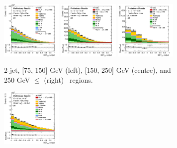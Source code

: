 \begin{figure}[h!]
    \centering
    \begin{subfigure}[b]{\textwidth}
        \centering
        \includegraphics[width=0.32\textwidth]{Images/VH/Own_fit/prefit_VHcc/Region_distmva_BMax150_BMin75_DSR_J2_TTypext_T2_L1_Y6051_Prefit.png}
        \includegraphics[width=0.32\textwidth]{Images/VH/Own_fit/prefit_VHcc/Region_distmva_BMax250_BMin150_DSR_J2_TTypext_T2_L1_Y6051_Prefit.png}
        \includegraphics[width=0.32\textwidth]{Images/VH/Own_fit/prefit_VHcc/Region_distmva_BMin250_DSR_J2_TTypext_T2_L1_Y6051_Prefit.png}
        \caption{2-jet, [75, 150] GeV (left), [150, 250] GeV (centre), and 250  GeV $\leq$ (right) \ptv\ regions.}
        \label{fig:plots_VHcc_1L_SR_2J_2c}
    \end{subfigure}
    \begin{subfigure}[b]{\textwidth}
        \centering
        \includegraphics[width=0.32\textwidth]{Images/VH/Own_fit/prefit_VHcc/Region_distmva_BMax150_BMin75_DSR_J3_TTypext_T2_L1_Y6051_Prefit.png}

\end{subfigure}
\end{figure}
